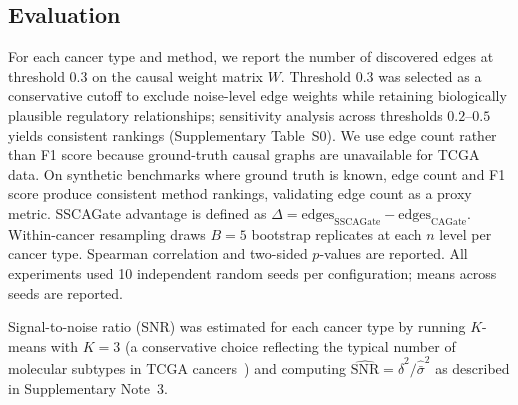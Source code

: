 \documentclass[12pt,a4paper]{article}
\begin{document}
\subsection{Evaluation}
For each cancer type and method, we report the number of discovered edges at threshold $0.3$ on the causal weight matrix $W$. Threshold $0.3$ was selected as a conservative cutoff to exclude noise-level edge weights while retaining biologically plausible regulatory relationships; sensitivity analysis across thresholds $0.2$--$0.5$ yields consistent rankings (Supplementary Table~S0). We use edge count rather than F1 score because ground-truth causal graphs are unavailable for TCGA data. On synthetic benchmarks where ground truth is known, edge count and F1 score produce consistent method rankings, validating edge count as a proxy metric. SSCAGate advantage is defined as $\Delta = \text{edges}_{\text{SSCAGate}} - \text{edges}_{\text{CAGate}}$. Within-cancer resampling draws $B = 5$ bootstrap replicates at each $n$ level per cancer type. Spearman correlation and two-sided $p$-values are reported. All experiments used 10 independent random seeds per configuration; means across seeds are reported.

Signal-to-noise ratio (SNR) was estimated for each cancer type by running $K$-means with $K = 3$ (a conservative choice reflecting the typical number of molecular subtypes in TCGA cancers~\cite{hoadley2018cell}) and computing $\widehat{\text{SNR}} = \hat{\delta}^2 / \hat{\bar{\sigma}}^2$ as described in Supplementary Note~3.
\end{document}
